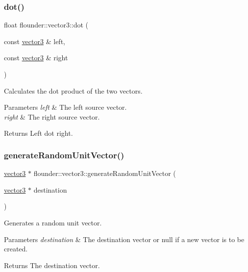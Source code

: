 \subsubsection{\texorpdfstring{dot()}{dot()}}
{\footnotesize\ttfamily float flounder\+::vector3\+::dot (\begin{DoxyParamCaption}\item[{const \hyperlink{classflounder_1_1vector3}{vector3} \&}]{left,  }\item[{const \hyperlink{classflounder_1_1vector3}{vector3} \&}]{right }\end{DoxyParamCaption})\hspace{0.3cm}{\ttfamily [static]}}



Calculates the dot product of the two vectors. 


\begin{DoxyParams}{Parameters}
{\em left} & The left source vector. \\
\hline
{\em right} & The right source vector. \\
\hline
\end{DoxyParams}
\begin{DoxyReturn}{Returns}
Left dot right. 
\end{DoxyReturn}
\mbox{\label{classflounder_1_1vector3_a6c8eeac56a831b4e3ca221e19f86031e}} 
\subsubsection{\texorpdfstring{generate\+Random\+Unit\+Vector()}{generateRandomUnitVector()}}
{\footnotesize\ttfamily \hyperlink{classflounder_1_1vector3}{vector3} $\ast$ flounder\+::vector3\+::generate\+Random\+Unit\+Vector (\begin{DoxyParamCaption}\item[{\hyperlink{classflounder_1_1vector3}{vector3} $\ast$}]{destination }\end{DoxyParamCaption})\hspace{0.3cm}{\ttfamily [static]}}



Generates a random unit vector. 


\begin{DoxyParams}{Parameters}
{\em destination} & The destination vector or null if a new vector is to be created. \\
\hline
\end{DoxyParams}
\begin{DoxyReturn}{Returns}
The destination vector. 
\end{DoxyReturn}
\mbox{\label{classflounder_1_1vector3_a84374d3a1d99b2bcdcee65ade03e10c4}} 
